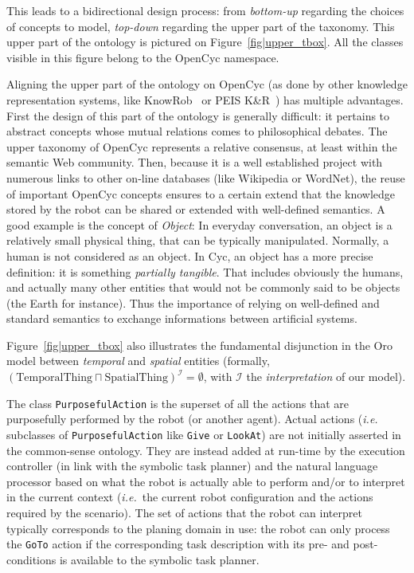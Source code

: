 \documentclass[preprint,3p,times]{elsarticle}
\newcommand{\concept}[1]{{\small \texttt{#1}}}
\newcommand{\ie}{{\textit{i.e.\ }}}
\begin{document}
This leads to a bidirectional design process: from \emph{bottom-up} regarding
the choices of concepts to model, \emph{top-down} regarding the upper part of
the taxonomy. This upper part of the ontology is pictured on
Figure~\ref{fig|upper_tbox}. All the classes visible in this figure belong to
the {\sc OpenCyc} namespace.

Aligning the upper part of the ontology on {\sc OpenCyc} (as done by other
knowledge representation systems, like {\sc KnowRob}~\cite{Tenorth2009a} or PEIS
K\&R~\cite{Daoutis2009}) has multiple advantages. First the design of this part
of the ontology is generally difficult: it pertains to abstract concepts whose
mutual relations comes to philosophical debates. The upper taxonomy of {\sc
OpenCyc} represents a relative consensus, at least within the semantic Web
community. Then, because it is a well established project with numerous links to
other on-line databases (like Wikipedia or WordNet), the reuse of important {\sc
OpenCyc} concepts ensures to a certain extend that the knowledge stored by the
robot can be shared or extended with well-defined semantics. A good example is
the concept of \emph{Object}: In everyday conversation, an object is a
relatively small physical thing, that can be typically manipulated. Normally, a
human is not considered as an object. In {\sc Cyc}, an object has a more precise
definition: it is something \emph{partially tangible}. That includes obviously
the humans, and actually many other entities that would not be commonly said to
be objects (the Earth for instance). Thus the importance of relying on
well-defined and standard semantics to exchange informations between artificial
systems.

Figure~\ref{fig|upper_tbox} also illustrates the fundamental disjunction
in the {\sc Oro} model between \emph{temporal} and \emph{spatial} entities (formally,
$(\text{TemporalThing} \sqcap \text{SpatialThing})^{\mathcal{I}} = \emptyset$, with
$\mathcal{I}$ the \emph{interpretation} of our model).

The class \concept{PurposefulAction} is the superset of all the actions that are
purposefully performed by the robot (or another agent). Actual actions (\ie
subclasses of \concept{PurposefulAction} like \concept{Give} or
\concept{LookAt}) are not initially asserted in the common-sense ontology. They
are instead added at run-time by the execution controller (in link with the
symbolic task planner) and the natural language processor based on what the
robot is actually able to perform and/or to interpret in the current context
(\ie the current robot configuration and the actions required by the scenario).
The set of actions that the robot can interpret typically corresponds to the
planing domain in use: the robot can only process the \concept{GoTo} action if
the corresponding task description with its pre- and post-conditions is
available to the symbolic task planner.
\end{document}
